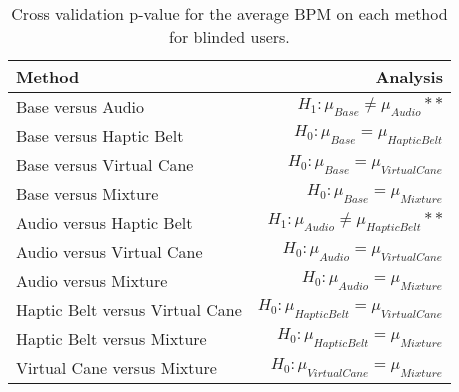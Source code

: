 
\begin{table}[!htb]
\centering
\caption{Cross validation p-value for the average BPM on each method for blinded users.}
\label{tab:lsd_average_bpm}
\begin{tabular}{lr}
\toprule
                         Method &                                       Analysis \\
\midrule
              Base versus Audio &           $H_1 : \mu_{Base} \ne \mu_{Audio}**$ \\
        Base versus Haptic Belt &         $H_0 : \mu_{Base} = \mu_{Haptic Belt}$ \\
       Base versus Virtual Cane &        $H_0 : \mu_{Base} = \mu_{Virtual Cane}$ \\
            Base versus Mixture &             $H_0 : \mu_{Base} = \mu_{Mixture}$ \\
       Audio versus Haptic Belt &    $H_1 : \mu_{Audio} \ne \mu_{Haptic Belt}**$ \\
      Audio versus Virtual Cane &       $H_0 : \mu_{Audio} = \mu_{Virtual Cane}$ \\
           Audio versus Mixture &            $H_0 : \mu_{Audio} = \mu_{Mixture}$ \\
Haptic Belt versus Virtual Cane & $H_0 : \mu_{Haptic Belt} = \mu_{Virtual Cane}$ \\
     Haptic Belt versus Mixture &      $H_0 : \mu_{Haptic Belt} = \mu_{Mixture}$ \\
    Virtual Cane versus Mixture &     $H_0 : \mu_{Virtual Cane} = \mu_{Mixture}$ \\
\bottomrule
\end{tabular}
\end{table}

